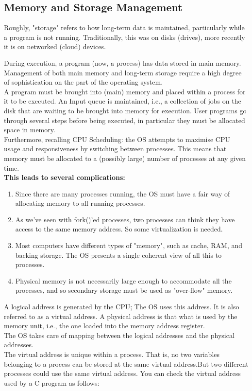\documentclass[a4paper, 10pt]{article}
\begin{document}
\subsection{Memory and Storage Management}
\begin{definitionbox}{}
    Roughly, "storage" refers to how long-term data is maintained, particularly while a program is not running. Traditionally, this was on disks (drives), more recently it is on networked (cloud) devices.
\end{definitionbox}
\noindent During execution, a program (now, a process) has data stored in main memory. Management of both main memory and long-term storage require a high degree of sophistication on the part of the operating system. \\[2ex]
A program must be brought into (main) memory and placed within a process for it to be executed. An Input queue is maintained, i.e., a collection of jobs on the disk that are waiting to be brought into memory for execution. User programs go through several steps before being executed, in particular they must be allocated space in memory.\\[2ex]
Furthermore, recalling CPU Scheduling: the OS attempts to maximise CPU usage and responsiveness by switching between processes. This means that memory must be allocated to a (possibly large) number of processes at any given time. \\[2ex]
\textbf{This leads to several complications:}
\begin{enumerate}
    \item Since there are many processes running, the OS must have a fair way of allocating memory to all running processes.
    \item As we've seen with fork()'ed processes, two processes can think they have access to the same memory address. So some virtualization is needed.
    \item Most computers have different types of "memory", such as cache, RAM, and backing storage. The OS presents a single coherent view of all this to processes.
    \item Physical memory is not necessarily large enough to accommodate all the processes, and so secondary storage must be used as "over-flow" memory.
\end{enumerate}
A logical address is generated by the CPU; The OS uses this address. It is also referred to as a virtual address. A physical address is that what is used by the memory unit, i.e., the one loaded into the memory address register. \\[2ex]
The OS takes care of mapping between the logical addresses and the physical addresses. \\[2ex]
The virtual address is unique within a process. That is, no two variables belonging to a process can be stored at the same virtual address.But two different processes could use the same virtual address. You can check the virtual address used by a C program as follows:
\end{document}
